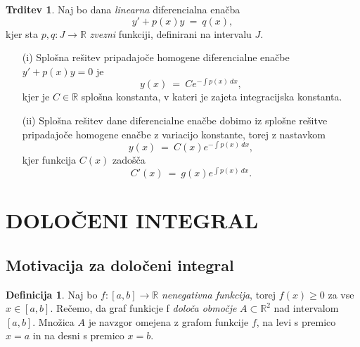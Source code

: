 \documentclass[11pt]{article}
\theoremstyle{definition}
\newtheorem{definicija}{Definicija}[section]
\theoremstyle{definition}
\newtheorem{trditev}{Trditev}[section]
\theoremstyle{definition}
\theoremstyle{theorem}
\begin{document}
\begin{trditev}

Naj bo dana \textit{linearna} diferencialna enačba 
$$y' + p(x) y ~=~ q(x),$$
kjer sta $p, q: J \rightarrow \mathbb{R}$ \textit{zvezni} funkciji, definirani na intervalu $J$.
\begin{enumerate}

	\item[(i)] Splošna rešitev pripadajoče homogene diferencialne enačbe \\ $y' + p(x) y = 0$ je
	$$y(x) ~=~ Ce^{-\int p(x)~dx},$$
	kjer je $C \in \mathbb{R}$ splošna konstanta, v kateri je zajeta integracijska konstanta.
	
	\item[(ii)] Splošna rešitev dane diferencialne enačbe dobimo iz splošne rešitve pripadajoče homogene enačbe z variacijo konstante, torej z nastavkom
	$$y(x) ~=~ C(x)e^{-\int p(x)~dx},$$
	kjer funkcija $C(x)$ zadošča
	$$C'(x) ~=~ g(x)e^{\int p(x)~dx}.$$

\end{enumerate}

\end{trditev}
\vspace{0.5cm}


\pagebreak


\section{DOLOČENI INTEGRAL}
\vspace{0.5cm}


\subsection{Motivacija za določeni integral}
\vspace{0.5cm}

\begin{definicija}

Naj bo $f:[a, b] \rightarrow \mathbb{R}$ \textit{nenegativna funkcija}, torej $f(x) \geq 0$ za vse $x \in [a, b]$. Rečemo, da graf funkicje f \textit{določa območje} $A \subset \mathbb{R}^2$  nad intervalom $[a, b]$. Množica $A$ je navzgor omejena z grafom funkcije $f$, na levi s premico $x=a$ in na desni s premico $x=b$.

\end{definicija}
\vspace{0.5cm}
\end{document}
